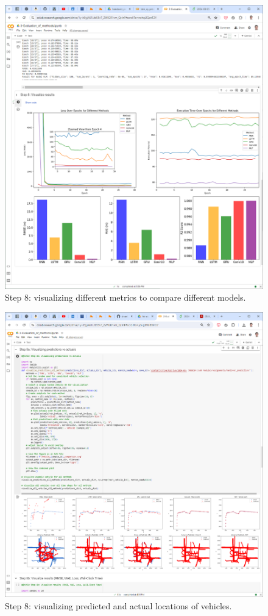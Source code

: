 \documentclass[journal,onecolumn]{IEEEtran}
\begin{document}
{\begin{appendices}
\begin{figure}
    \centering
    \includegraphics[width=1.01\linewidth]{figures/scr-3-colab.png}
    \caption{Step 8: visualizing different metrics to compare different models.}
    \label{fig:scr-3-colab}
\end{figure}

\begin{figure}
    \centering
    \includegraphics[width=1.01\linewidth]{figures/scr-4-colab.png}
    \caption{Step 8: visualizing predicted and actual locations of vehicles.}
    \label{fig:scr-4-colab}
\end{figure}


\end{appendices}}
\end{document}
